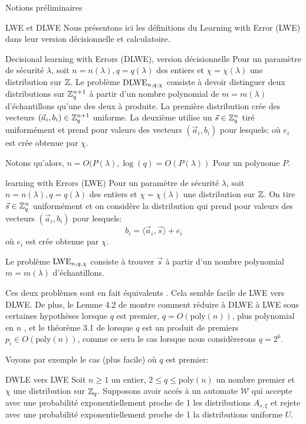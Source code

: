 \begin{section}{Notions préliminaires}
	\begin{subsection}{LWE et DLWE}
	Nous présentons ici les définitions du Learning with Error
	(LWE) dans leur version décisionnelle et calculatoire.
	
	\begin{definition}{Decisional learning with Errors (DLWE), version décisionnelle}
	Pour un paramètre de sécurité $\lambda$, soit $n = n(\lambda),q = q(\lambda)$ 
	des entiers et $\chi = \chi(\lambda)$ une
	distribution sur $\mathbb{Z}$.
	Le problème $\text{DLWE}_{n,q,\chi}$ consiste à devoir distinguer 
	deux distributions sur $\mathbb{Z}_q^{n+1}$ à partir d'un nombre polynomial
	de $m = m(\lambda)$ d'échantillons qu'une des deux à produite.
	La première distribution crée des vecteurs $(\vec{a}_i,b_i) \in
	\mathbb{Z}_q^{n+1}$ uniforme.
	La deuxième utilise un $\vec{s} \in \mathbb{Z}_q^n$ tiré uniformément et 
	prend pour valeurs des vecteurs $(\vec{a}_i, b_i)$ pour lesquels:
	où $e_i$ est crée obtenue par $\chi$.
	\end{definition}
	Notons qu'alors, $n = O(P(\lambda), \log(q) = O(P(\lambda))$ 
	Pour un polynome $P$.

	\begin{definition}{learning with Errors (LWE)}
	Pour un paramètre de sécurité $\lambda$, soit $n = n(\lambda),q = q(\lambda)$ 
	des entiers et $\chi = \chi(\lambda)$ une
	distribution sur $\mathbb{Z}$. On tire $\vec{s} \in \mathbb{Z}_q^n$ uniformément 
	et on considère la distribution qui  
	prend pour valeurs des vecteurs $(\vec{a}_i, b_i)$ pour lesquels:
		\[ b_i = \langle \vec{a}_i, \vec{s} \rangle + e_i \]
	où $e_i$ est crée obtenue par $\chi$.

	Le problème $\text{LWE}_{n,q,\chi}$ consiste à trouver $\vec{s}$ à partir d'un nombre
	polynomial $m = m(\lambda)$ d'échantillons.
	\end{definition}

	Ces deux problèmes sont en fait \og équivalents \fg. Cela semble facile
	de LWE vers DLWE. De plus, 
	le Lemme 4.2 de \cite{STOC:Regev05} montre comment réduire à
	DLWE à LWE sous certaines hypothèses lorsque $q$ est premier,
	$q = O(\text{poly}(n))$, plus
	polynomial en $n$ , et 
	le théorème 3.1 de \cite{EPRINT:MicPei11} lorsque $q$ est un produit 
	de premiers $p_i \in O(\text{poly}(n))$, comme ce sera le cas lorsque 
	nous considèrerons 
	$q = 2^k$.

	Voyons par exemple le cas (plus facile) où $q$ est premier:

	\begin{prop}{DWLE vers LWE}
	Soit $n \geq 1$ un entier, $2 \leq q \leq \text{poly}(n)$ un
	nombre premier et $\chi$ une distribution sur $\mathbb{Z}_q$.
	Supposons avoir accés à un automate $\mathcal{W}$ qui accepte 
	avec une probabilité exponentiellement proche de 1 les 
	distributions $A_{s, \xi}$ et rejete avec une probabilité
	exponentiellement proche de 1 la distributions uniforme $U$.


\end{prop}
\end{subsection}
\end{section}
